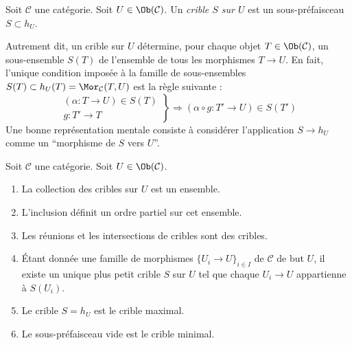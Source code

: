 \begin{definition}
\label{definition-sieve}
Soit $\mathcal{C}$ une catégorie. Soit $U \in \Ob(\mathcal{C})$.
Un {\it crible $S$ sur $U$} est un sous-préfaisceau $S \subset h_U$.
\end{definition}

\noindent
Autrement dit, un crible sur $U$ détermine, pour chaque objet
$T \in \Ob(\mathcal{C})$, un sous-ensemble $S(T)$ de l'ensemble
de tous les morphismes $T \to U$. En fait, l'unique condition
imposée à la famille de sous-ensembles
$S(T) \subset h_U(T) = \Mor_\mathcal{C}(T, U)$
est la règle suivante :
\begin{equation}
\label{equation-property-sieve}
\left.
\begin{matrix}
(\alpha : T \to U) \in S(T) \\
g : T' \to T
\end{matrix}
\right\} \Rightarrow
(\alpha \circ g : T' \to U) \in S(T')
\end{equation}
Une bonne représentation mentale consiste à considérer
l'application $S \to h_U$ comme un ``morphisme de $S$ vers $U$''.

\begin{lemma}
\label{lemma-sieves-set}
Soit $\mathcal{C}$ une catégorie. Soit $U \in \Ob(\mathcal{C})$.
\begin{enumerate}
\item La collection des cribles sur $U$ est un ensemble.
\item L'inclusion définit un ordre partiel sur cet ensemble.
\item Les réunions et les intersections de cribles sont des cribles.
\item
\label{item-sieve-generated}
Étant donnée une famille de morphismes $\{U_i \to U\}_{i\in I}$
de $\mathcal{C}$ de but $U$,
il existe un unique plus petit crible $S$ sur $U$ tel que
chaque $U_i \to U$ appartienne à $S(U_i)$.
\item Le crible $S = h_U$ est le crible maximal.
\item Le sous-préfaisceau vide est le crible minimal.
\end{enumerate}
\end{lemma}

